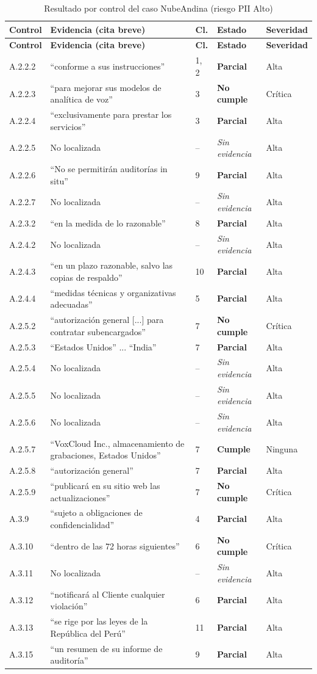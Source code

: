 \documentclass[12pt,letterpaper]{article}
\newcommand{\eC}{\textbf{Cumple}}
\newcommand{\eP}{\textbf{Parcial}}
\newcommand{\eNC}{\textbf{No cumple}}
\newcommand{\eSE}{\textit{Sin evidencia}}
\begin{document}
\begin{small}
\begin{longtable}{@{}l L{4.7cm} L{0.9cm} L{2.2cm} L{1.8cm}@{}}
\caption{Resultado por control del caso NubeAndina (riesgo PII Alto)}\label{tab:matriz}\\
\toprule
\textbf{Control} & \textbf{Evidencia (cita breve)} & \textbf{Cl.} & \textbf{Estado} & \textbf{Severidad} \\
\midrule
\endfirsthead
\toprule
\textbf{Control} & \textbf{Evidencia (cita breve)} & \textbf{Cl.} & \textbf{Estado} & \textbf{Severidad} \\
\midrule
\endhead
\bottomrule
\endfoot
A.2.2.2 & ``conforme a sus instrucciones'' & 1, 2 & \eP & Alta \\
A.2.2.3 & ``para mejorar sus modelos de analítica de voz'' & 3 & \eNC & Crítica \\
A.2.2.4 & ``exclusivamente para prestar los servicios'' & 3 & \eP & Alta \\
A.2.2.5 & No localizada & -- & \eSE & Alta \\
A.2.2.6 & ``No se permitirán auditorías in situ'' & 9 & \eP & Alta \\
A.2.2.7 & No localizada & -- & \eSE & Alta \\
A.2.3.2 & ``en la medida de lo razonable'' & 8 & \eP & Alta \\
A.2.4.2 & No localizada & -- & \eSE & Alta \\
A.2.4.3 & ``en un plazo razonable, salvo las copias de respaldo'' & 10 & \eP & Alta \\
A.2.4.4 & ``medidas técnicas y organizativas adecuadas'' & 5 & \eP & Alta \\
A.2.5.2 & ``autorización general [...] para contratar subencargados'' & 7 & \eNC & Crítica \\
A.2.5.3 & ``Estados Unidos'' ... ``India'' & 7 & \eP & Alta \\
A.2.5.4 & No localizada & -- & \eSE & Alta \\
A.2.5.5 & No localizada & -- & \eSE & Alta \\
A.2.5.6 & No localizada & -- & \eSE & Alta \\
A.2.5.7 & ``VoxCloud Inc., almacenamiento de grabaciones, Estados Unidos'' & 7 & \eC & Ninguna \\
A.2.5.8 & ``autorización general'' & 7 & \eP & Alta \\
A.2.5.9 & ``publicará en su sitio web las actualizaciones'' & 7 & \eNC & Crítica \\
A.3.9 & ``sujeto a obligaciones de confidencialidad'' & 4 & \eP & Alta \\
A.3.10 & ``dentro de las 72 horas siguientes'' & 6 & \eNC & Crítica \\
A.3.11 & No localizada & -- & \eSE & Alta \\
A.3.12 & ``notificará al Cliente cualquier violación'' & 6 & \eP & Alta \\
A.3.13 & ``se rige por las leyes de la República del Perú'' & 11 & \eP & Alta \\
A.3.15 & ``un resumen de su informe de auditoría'' & 9 & \eP & Alta \\
\end{longtable}
\end{small}
\end{document}
